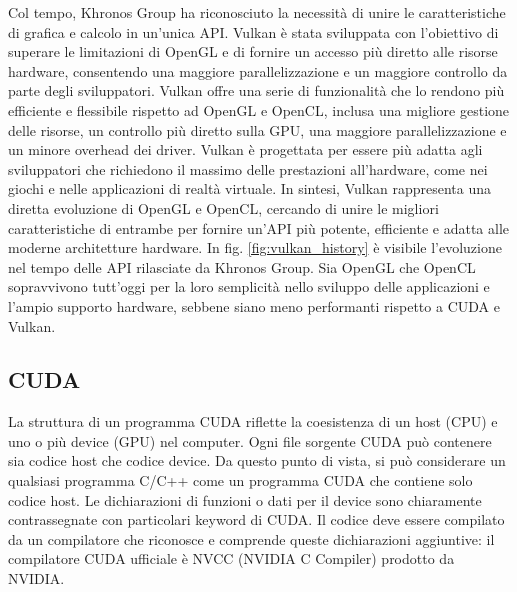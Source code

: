Col tempo, Khronos Group ha riconosciuto la necessità di unire le caratteristiche di grafica e calcolo in un'unica API. Vulkan è stata sviluppata con l'obiettivo di superare le limitazioni di OpenGL e di fornire un accesso più diretto alle risorse hardware, consentendo una maggiore parallelizzazione e un maggiore controllo da parte degli sviluppatori. Vulkan offre una serie di funzionalità che lo rendono più efficiente e flessibile rispetto ad OpenGL e OpenCL, inclusa una migliore gestione delle risorse, un controllo più diretto sulla GPU, una maggiore parallelizzazione e un minore overhead dei driver. Vulkan è progettata per essere più adatta agli sviluppatori che richiedono il massimo delle prestazioni all'hardware, come nei giochi e nelle applicazioni di realtà virtuale. In sintesi, Vulkan rappresenta una diretta evoluzione di OpenGL e OpenCL, cercando di unire le migliori caratteristiche di entrambe per fornire un'API più potente, efficiente e adatta alle moderne architetture hardware. In fig. \ref{fig:vulkan_history} è visibile l'evoluzione nel tempo delle API rilasciate da Khronos Group. Sia OpenGL che OpenCL sopravvivono tutt'oggi per la loro semplicità nello sviluppo delle applicazioni e l'ampio supporto hardware, sebbene siano meno performanti rispetto a CUDA e Vulkan.

\subsection[CUDA]{CUDA}

La struttura di un programma CUDA riflette la coesistenza di un host (CPU) e uno o più device (GPU) nel computer. Ogni file sorgente CUDA può contenere sia codice host che codice device. Da questo punto di vista, si può considerare un qualsiasi programma C/C++ come un programma CUDA che contiene solo codice host. Le dichiarazioni di funzioni o dati per il device sono chiaramente contrassegnate con particolari keyword di CUDA. Il codice deve essere compilato da un compilatore che riconosce e comprende queste dichiarazioni aggiuntive: il compilatore CUDA ufficiale è NVCC (NVIDIA C Compiler) prodotto da NVIDIA.

